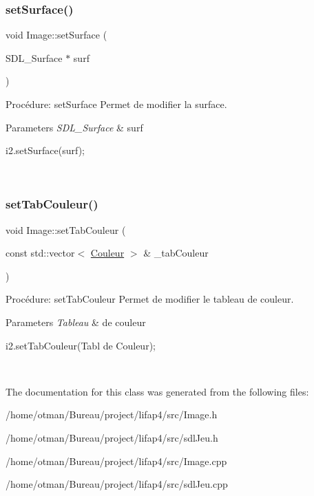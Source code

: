 \subsubsection{\texorpdfstring{set\+Surface()}{setSurface()}}
{\footnotesize\ttfamily void Image\+::set\+Surface (\begin{DoxyParamCaption}\item[{S\+D\+L\+\_\+\+Surface $\ast$}]{surf }\end{DoxyParamCaption})}



Procédure\+: set\+Surface Permet de modifier la surface. 


\begin{DoxyParams}{Parameters}
{\em S\+D\+L\+\_\+\+Surface} & surf 
\begin{DoxyCode}
i2.setSurface(surf);
\end{DoxyCode}
 \\
\hline
\end{DoxyParams}
\mbox{\label{classImage_a17feecebcbde65970ffa419ba9f0465a}} 
\subsubsection{\texorpdfstring{set\+Tab\+Couleur()}{setTabCouleur()}}
{\footnotesize\ttfamily void Image\+::set\+Tab\+Couleur (\begin{DoxyParamCaption}\item[{const std\+::vector$<$ \hyperlink{classCouleur}{Couleur} $>$ \&}]{\+\_\+tab\+Couleur }\end{DoxyParamCaption})}



Procédure\+: set\+Tab\+Couleur Permet de modifier le tableau de couleur. 


\begin{DoxyParams}{Parameters}
{\em Tableau} & de couleur 
\begin{DoxyCode}
i2.setTabCouleur(Tabl de Couleur);
\end{DoxyCode}
 \\
\hline
\end{DoxyParams}


The documentation for this class was generated from the following files\+:\begin{DoxyCompactItemize}
\item 
/home/otman/\+Bureau/project/lifap4/src/Image.\+h\item 
/home/otman/\+Bureau/project/lifap4/src/sdl\+Jeu.\+h\item 
/home/otman/\+Bureau/project/lifap4/src/Image.\+cpp\item 
/home/otman/\+Bureau/project/lifap4/src/sdl\+Jeu.\+cpp\end{DoxyCompactItemize}
